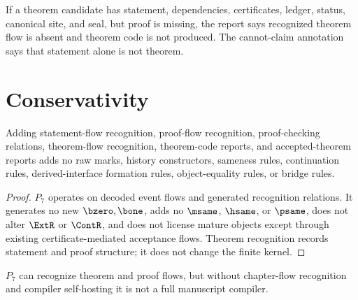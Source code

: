 \begin{example}
\label{ex:theorem-proof-incomplete-theorem}
If a theorem candidate has statement, dependencies, certificates, ledger, status, canonical site, and seal, but proof is missing, the report says recognized theorem flow is absent and theorem code is not produced. The cannot-claim annotation says that statement alone is not theorem.
\end{example}

\section{Conservativity}
\label{sec:theorem-proof-conservativity}

\begin{theorem}
\label{thm:theorem-proof-p7-conservative}
Adding statement-flow recognition, proof-flow recognition, proof-checking relations, theorem-flow recognition, theorem-code reports, and accepted-theorem reports adds no raw marks, history constructors, sameness rules, continuation rules, derived-interface formation rules, object-equality rules, or bridge rules.
\end{theorem}

\begin{proof}
$P_7$ operates on decoded event flows and generated recognition relations. It generates no new $\bzero,\bone$, adds no $\msame$, $\hsame$, or $\psame$, does not alter $\ExtR$ or $\ContR$, and does not license mature objects except through existing certificate-mediated acceptance flows. Theorem recognition records statement and proof structure; it does not change the finite kernel.
\end{proof}

\begin{corollary}
\label{cor:theorem-proof-p7-theorem-reporting-layer}
$P_7$ can recognize theorem and proof flows, but without chapter-flow recognition and compiler self-hosting it is not a full manuscript compiler.
\end{corollary}

